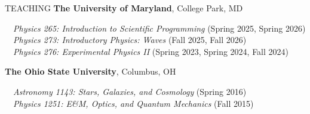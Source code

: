 \documentclass{resume} %
\begin{document}
\begin{rSection}{TEACHING}
{\bf The University of Maryland}, College Park, MD

\-\ \-\ \textit{Physics 265: Introduction to Scientific Programming} (Spring 2025, Spring 2026) \\
\-\ \-\ \textit{Physics 273: Introductory Physics: Waves} (Fall 2025, Fall 2026) \\
\-\ \-\ \textit{Physics 276: Experimental Physics II} (Spring 2023, Spring 2024, Fall 2024)

{\bf The Ohio State University}, Columbus, OH 

\-\ \-\ \textit{Astronomy 1143: Stars, Galaxies, and Cosmology} (Spring 2016) \\
\-\ \-\ \textit{Physics 1251: E\&M, Optics, and Quantum Mechanics} (Fall 2015)




\end{rSection}

\end{document}
